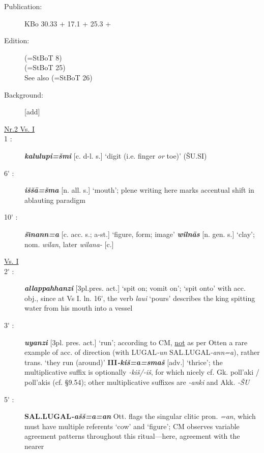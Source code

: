 \documentclass[10pt]{article}
\newcommand{\bit}[1]{\textbf{\textit{#1}}}				%
\newcommand{\p}[1]{{\tiny[{#1}]}}					%
\newcommand{\I}{\={\i}}									%
\newcommand{\pr}{\'{ }}									%
\newcommand{\hith}{\textsubwedge{h}}
\renewcommand{\.}[1]{\textsubdot{#1}}
\begin{document}
\begin{description}

\item[Publication:] KBo 30.33 + 17.1 + 25.3 +
\item[Edition:] \citet{otten1969king} (=StBoT 8) \\
\citet{neu1980ritual} (=StBoT 25) \\
See also \citet{neu1983glossary} (=StBoT 26)
\item[Background:] [add]


\item[\underline{Nr.2 Vs. I}]

\item[1 :] \bit{kalulupi=\v{s}mi} \p{c. d-l. s.} `digit (i.e. finger \textit{or} toe)' (\v{S}U.SI) 

\item[6{\pr} :] \bit{i\v{s}\v{s}\=a=\v{s}ma} \p{n. all. s.} `mouth'; plene writing here marks accentual shift in ablauting paradigm

\item[10{\pr} :] \bit{\v{s}{\I}nann=a} \p{c. acc. s.; a-st.} `figure, form; image' \bit{wiln\=as} \p{n. gen. s.} `clay'; nom. \textit{wilan}, later \textit{wilana-} \p{c.}


\item[\underline{Vs. I}]

\item[2{\pr} :] \bit{allappahhanzi} \p{3pl.pres. act.} `spit on; vomit on'; `spit onto' with acc. obj., since at Vs I. ln. 16{\pr}, the verb \textit{la{\hith}ui} `pours' describes the king spitting water from his mouth into a vessel

\item[3{\pr} :] \bit{{\hith}uyanzi} \p{3pl. pres. act.} `run'; according to CM, \underline{not} as per Otten a rare example of acc. of direction (with LUGAL\textit{-un} SAL.LUGAL\textit{-ann=a}), rather trans. `they run (around)' \textbf{III}\bit{-ki\v{s}=a=sma\v{s}} \p{adv.} `thrice'; the multiplicative suffix is optionally \textit{-ki\v{s}/-i\v{s}}, for which nicely cf. Gk. {\greektext poll'aki / poll'akis} (cf.  \S9.54); other multiplicative suffixes are \textit{-anki} and Akk. \textit{-\v{S}U}

\item[5{\pr} :] \textbf{SAL.LUGAL}\bit{-a\v{s}\v{s}=a=an} Ott. flags the singular clitic pron. \textit{=an}, which must have  multiple referents `cow' and `figure'; CM observes variable agreement patterns throughout this ritual---here, agreement with the nearer


\end{description}
\end{document}
